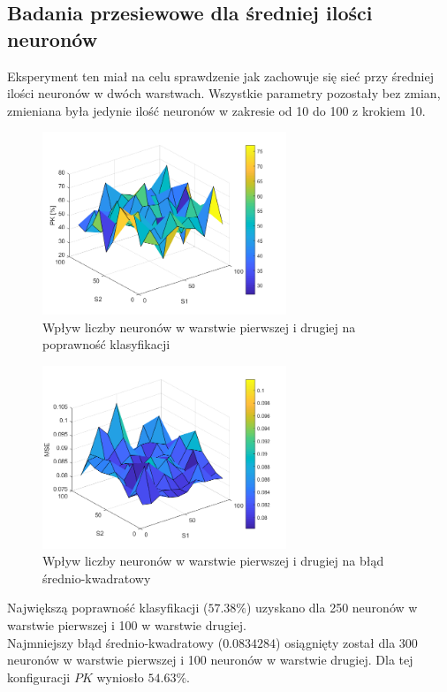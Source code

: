 \subsection{Badania przesiewowe dla średniej ilości neuronów}
Eksperyment ten miał na celu sprawdzenie jak zachowuje się sieć przy średniej ilości neuronów w dwóch warstwach. Wszystkie parametry pozostały bez zmian, zmieniana była jedynie ilość neuronów w zakresie od 10 do 100 z krokiem 10.
\begin{figure}[!h]
\centering
\includegraphics[width = 0.65\textwidth]{Grafika/pk_srednie.png}
\caption{Wpływ liczby neuronów w warstwie pierwszej i drugiej na poprawność klasyfikacji}
\label{fig:PKeksperyment3}
\end{figure}
\begin{figure}[!h]
\centering
\includegraphics[width = 0.65\textwidth]{Grafika/mse_srednie.png}
\caption{Wpływ liczby neuronów w warstwie pierwszej i drugiej na błąd średnio-kwadratowy}
\label{fig:MSEeksperyment3}
\end{figure}

Największą poprawność klasyfikacji ($57.38\%$) uzyskano dla 250 neuronów w warstwie pierwszej i 100 w warstwie drugiej.\\
Najmniejszy błąd średnio-kwadratowy ($0.0834284$) osiągnięty został dla 300 neuronów w warstwie pierwszej i 100 neuronów w warstwie drugiej. Dla tej konfiguracji $PK$ wyniosło $54.63\%$.\\